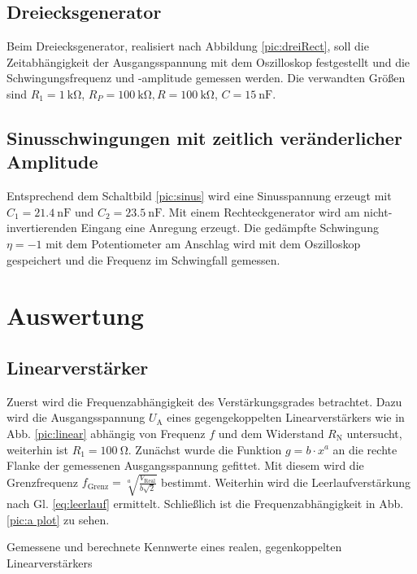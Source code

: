 \subsection{Dreiecksgenerator}
Beim Dreiecksgenerator, realisiert nach Abbildung \ref{pic:dreiRect},
soll die Zeitabhängigkeit der Ausgangsspannung mit dem Oszilloskop
festgestellt und die Schwingungsfrequenz und -amplitude gemessen werden.
Die verwandten Größen sind $R_1 = \SI{1}{\kilo\ohm}$, $R_P = \SI{100}{\kilo\ohm},
R= \SI{100}{\kilo\ohm}$, $C = \SI{15}{\nano\farad}$.

\subsection{Sinusschwingungen mit zeitlich veränderlicher Amplitude}
Entsprechend dem Schaltbild \ref{pic:sinus} wird eine Sinusspannung
erzeugt mit $C_1 = \SI{21,4}{\nano\farad}$ und $C_2  = \SI{23,5}{\nano\farad}$.
Mit einem Rechteckgenerator wird am nicht-invertierenden Eingang
eine Anregung erzeugt. Die gedämpfte Schwingung $\eta = -1$ mit dem
Potentiometer am Anschlag wird mit dem Oszilloskop gespeichert und
die Frequenz im Schwingfall gemessen.



\section{Auswertung}
\subsection{Linearverstärker}
Zuerst wird die Frequenzabhängigkeit des Verstärkungsgrades betrachtet. Dazu wird die Ausgangsspannung $U_\text{A}$ eines gegengekoppelten Linearverstärkers wie in Abb. \ref{pic:linear} abhängig von Frequenz $f$ und dem Widerstand $R_\text{N}$ untersucht, weiterhin ist $R_1 = 100\ \si{\ohm}$. Zunächst wurde die Funktion $g = b \cdot x^a$ an die rechte Flanke der gemessenen Ausgangsspannung gefittet. Mit diesem wird die Grenzfrequenz $f_\text{Grenz} =\sqrt[a]{\frac{V_\text{Real}}{b\sqrt{2}}}$ bestimmt. Weiterhin wird die Leerlaufverstärkung nach Gl. \ref{eq:leerlauf} ermittelt. Schließlich ist die Frequenzabhängigkeit in Abb. \ref{pic:a plot} zu sehen.

\begin{table}
	\centering
	\caption{Gemessene und berechnete Kennwerte eines realen, gegenkoppelten Linearverstärkers}
	
	\label{table:a_real}
\end{table}

